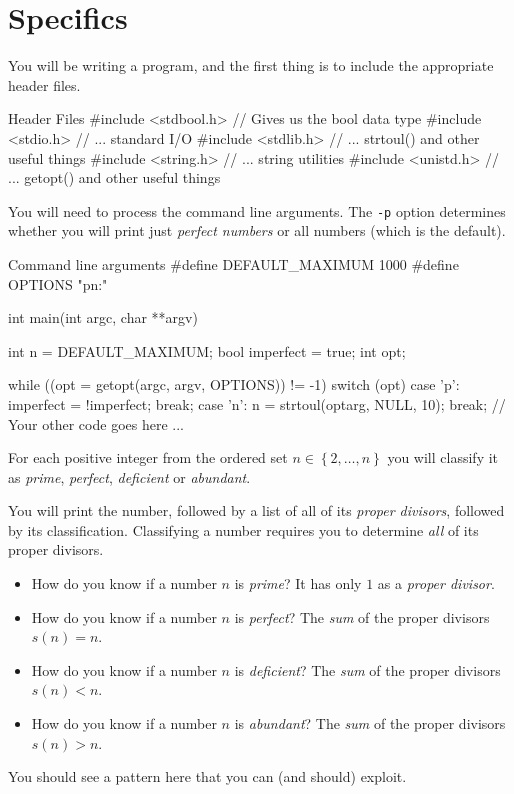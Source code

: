 \section{Specifics}\label{section:specifics}

You will be writing a \C program, and the first thing is to include
the appropriate header files.

\begin{clisting}{Header Files}
#include <stdbool.h> // Gives us the bool data type
#include <stdio.h>   // ... standard I/O
#include <stdlib.h>  // ... strtoul() and other useful things
#include <string.h>  // ... string utilities
#include <unistd.h>  // ... getopt() and other useful things
\end{clisting}

You will need to process the command line arguments.
The \texttt{-p} option determines whether you will print just
\emph{perfect numbers} or all numbers (which is the default).

\begin{clisting}{Command line arguments}
#define DEFAULT_MAXIMUM 1000
#define OPTIONS "pn:"

int main(int argc, char **argv) {
    int n = DEFAULT_MAXIMUM;
    bool imperfect = true;
    int opt;

    while ((opt = getopt(argc, argv, OPTIONS)) != -1) {
        switch (opt) {
        case 'p':
            imperfect = !imperfect;
            break;
        case 'n':
            n = strtoul(optarg, NULL, 10);
            break;
        }
    }
    // Your other code goes here ...
}
\end{clisting}

For each positive integer from the ordered set $n\in\left\{ 2, \ldots, n\right\}$ you will classify it
as \emph{prime}, \emph{perfect}, \emph{deficient} or \emph{abundant}.

You will print the number, followed by a list of all of its
\emph{proper divisors}, followed by its classification.
Classifying a number requires you to determine \emph{all} of its proper divisors.
\begin{itemize}
\item How do you know if a number $n$ is \emph{prime}? It has only
$1$ as a \emph{proper divisor}.

\item How do you know if a number $n$ is \emph{perfect}? The \emph{sum}
of the proper divisors $s(n) = n$.

\item How do you know if a number $n$ is \emph{deficient}? The
\emph{sum} of the proper divisors $s(n) < n$.

\item How do you know if a number $n$ is \emph{abundant}? The
\emph{sum} of the proper divisors $s(n) > n$.

\end{itemize}
You should see a pattern here that you can (and should) exploit.

